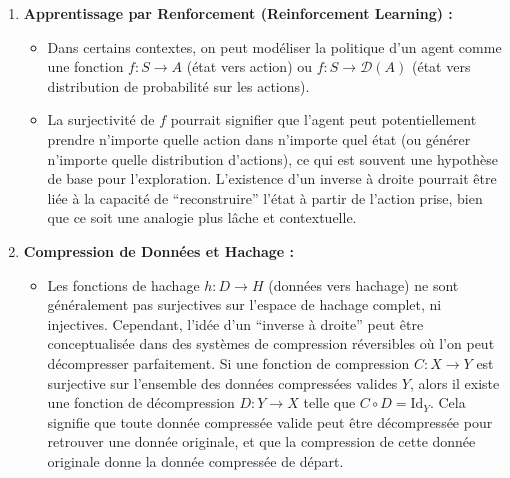 \documentclass[12pt,a4paper]{report}
\providecommand{\tightlist}{%
  \setlength{\itemsep}{0pt}\setlength{\parskip}{0pt}}
\begin{document}
\begin{enumerate}
  \begin{itemize}
  \tightlist
  \item
    En robotique, la cinématique directe est une fonction
    \(f: \Theta \to \mathcal{P}\) qui mappe un ensemble d'angles
    articulaires \(\Theta\) (l'espace de départ \(E\)) à une pose
    d'effecteur final \(\mathcal{P}\) (l'espace d'arrivée \(F\)).
  \item
    Si un robot peut atteindre n'importe quelle pose dans son espace de
    travail (c'est-à-dire que \(f\) est surjective sur l'espace de
    travail), alors il existe une fonction de cinématique inverse
    \(g: \mathcal{P} \to \Theta\) (un ``inverse à droite'') qui, pour
    une pose désirée \(p \in \mathcal{P}\), fournit un ensemble d'angles
    articulaires \(\theta = g(p)\) tel que \(f(\theta) = p\).
    C'est-à-dire \(f \circ g = \text{Id}_{\mathcal{P}}\). L'existence
    d'une telle fonction \(g\) est cruciale pour la planification de
    mouvement et le contrôle des robots, permettant de traduire une
    tâche dans l'espace opérationnel en commandes articulaires.
  \end{itemize}
\item
  \textbf{Apprentissage par Renforcement (Reinforcement Learning) :}

  \begin{itemize}
  \tightlist
  \item
    Dans certains contextes, on peut modéliser la politique d'un agent
    comme une fonction \(f: S \to A\) (état vers action) ou
    \(f: S \to \mathcal{D}(A)\) (état vers distribution de probabilité
    sur les actions).
  \item
    La surjectivité de \(f\) pourrait signifier que l'agent peut
    potentiellement prendre n'importe quelle action dans n'importe quel
    état (ou générer n'importe quelle distribution d'actions), ce qui
    est souvent une hypothèse de base pour l'exploration. L'existence
    d'un inverse à droite pourrait être liée à la capacité de
    ``reconstruire'' l'état à partir de l'action prise, bien que ce soit
    une analogie plus lâche et contextuelle.
  \end{itemize}
\item
  \textbf{Compression de Données et Hachage :}

  \begin{itemize}
  \tightlist
  \item
    Les fonctions de hachage \(h: D \to H\) (données vers hachage) ne
    sont généralement pas surjectives sur l'espace de hachage complet,
    ni injectives. Cependant, l'idée d'un ``inverse à droite'' peut être
    conceptualisée dans des systèmes de compression réversibles où l'on
    peut décompresser parfaitement. Si une fonction de compression
    \(C: X \to Y\) est surjective sur l'ensemble des données compressées
    valides \(Y\), alors il existe une fonction de décompression
    \(D: Y \to X\) telle que \(C \circ D = \text{Id}_Y\). Cela signifie
    que toute donnée compressée valide peut être décompressée pour
    retrouver une donnée originale, et que la compression de cette
    donnée originale donne la donnée compressée de départ.
  \end{itemize}
\end{enumerate}
\end{document}
